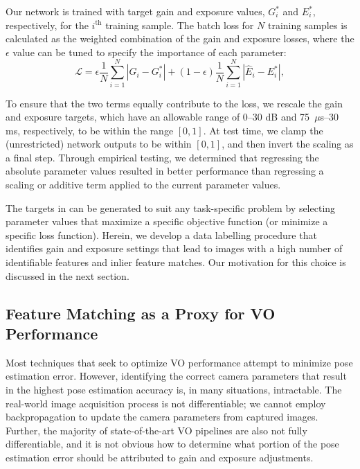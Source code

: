\documentclass[letterpaper, 10pt, journal, twoside]{IEEEtran}
\begin{document}
Our network is trained with target gain and exposure values, $G_i^*$ and $E_i^*$, respectively, for the $i^\text{th}$ training sample.  
The batch loss for $N$ training samples is calculated as the weighted combination of the gain and exposure losses, where the $\epsilon$ value can be tuned to specify the importance of each parameter:
\begin{equation}
\label{eqn:loss}
\mathcal{L} = \epsilon \frac{1}{N}\sum_{i=1}^{N}|\hat{G}_{i} - G_{i}^*| + (1-\epsilon)\frac{1}{N}\sum_{i=1}^{N}|\hat{E}_{i} - E_{i}^*|,
\end{equation}

\noindent To ensure that the two terms equally contribute to the loss, we rescale the gain and exposure targets, which have an allowable range of 0--30 dB and 75~$\mu$s--30 ms, respectively, to be within the range $\left[0, 1\right]$.
At test time, we clamp the (unrestricted) network outputs to be within $\left[0, 1\right]$, and then invert the scaling as a final step.
Through empirical testing, we determined that regressing the absolute parameter values resulted in better performance than regressing a scaling or additive term applied to the current parameter values.

The targets in  can be generated to suit any task-specific problem by selecting parameter values that maximize a specific objective function (or minimize a specific loss function). Herein, we develop a data labelling procedure that identifies gain and exposure settings that lead to images with a high number of identifiable features and inlier feature matches. Our motivation for this choice is discussed in the next section.

\subsection{Feature Matching as a Proxy for VO Performance}
\label{sec:vometrics}

Most techniques that seek to optimize VO performance attempt to minimize pose estimation error. However, identifying the correct camera parameters that result in the highest pose estimation accuracy is, in many situations, intractable. The real-world image acquisition process is not differentiable; we cannot employ backpropagation to update the camera parameters from captured images. Further, the majority of state-of-the-art VO pipelines are also not fully differentiable, and it is not obvious how to determine what portion of the pose estimation error should be attributed to gain and exposure adjustments.
\end{document}
